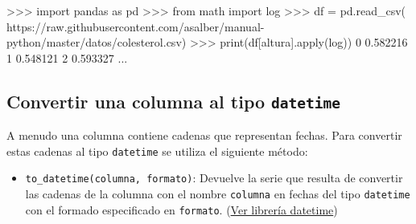 \documentclass[
  spanish,
  a4paper,
]{scrreport}
\newenvironment{Shaded}{\begin{snugshade}}{\end{snugshade}}
\newcommand{\BuiltInTok}[1]{\textcolor[rgb]{0.00,0.23,0.31}{#1}}
\newcommand{\DecValTok}[1]{\textcolor[rgb]{0.68,0.00,0.00}{#1}}
\newcommand{\FloatTok}[1]{\textcolor[rgb]{0.68,0.00,0.00}{#1}}
\newcommand{\ImportTok}[1]{\textcolor[rgb]{0.00,0.46,0.62}{#1}}
\newcommand{\NormalTok}[1]{\textcolor[rgb]{0.00,0.23,0.31}{#1}}
\newcommand{\OperatorTok}[1]{\textcolor[rgb]{0.37,0.37,0.37}{#1}}
\newcommand{\StringTok}[1]{\textcolor[rgb]{0.13,0.47,0.30}{#1}}
\providecommand{\tightlist}{%
  \setlength{\itemsep}{0pt}\setlength{\parskip}{0pt}}
\begin{document}
\begin{Shaded}
\begin{Highlighting}[]
\OperatorTok{\textgreater{}\textgreater{}\textgreater{}} \ImportTok{import}\NormalTok{ pandas }\ImportTok{as}\NormalTok{ pd}
\OperatorTok{\textgreater{}\textgreater{}\textgreater{}} \ImportTok{from}\NormalTok{ math }\ImportTok{import}\NormalTok{ log}
\OperatorTok{\textgreater{}\textgreater{}\textgreater{}}\NormalTok{ df }\OperatorTok{=}\NormalTok{ pd.read\_csv(}
\StringTok{\textquotesingle{}https://raw.githubusercontent.com/asalber/manual{-}python/master/datos/colesterol.csv\textquotesingle{}}\NormalTok{)}
\OperatorTok{\textgreater{}\textgreater{}\textgreater{}} \BuiltInTok{print}\NormalTok{(df[}\StringTok{\textquotesingle{}altura\textquotesingle{}}\NormalTok{].}\BuiltInTok{apply}\NormalTok{(log))}
\DecValTok{0}     \FloatTok{0.582216}
\DecValTok{1}     \FloatTok{0.548121}
\DecValTok{2}     \FloatTok{0.593327}
\NormalTok{...}
\end{Highlighting}
\end{Shaded}

\subsection{\texorpdfstring{Convertir una columna al tipo
\texttt{datetime}}{Convertir una columna al tipo datetime}}\label{convertir-una-columna-al-tipo-datetime}

A menudo una columna contiene cadenas que representan fechas. Para
convertir estas cadenas al tipo \texttt{datetime} se utiliza el
siguiente método:

\begin{itemize}
\tightlist
\item
  \texttt{to\_datetime(columna,\ formato)}: Devuelve la serie que
  resulta de convertir las cadenas de la columna con el nombre
  \texttt{columna} en fechas del tipo \texttt{datetime} con el formado
  especificado en \texttt{formato}. (\href{../datetime/}{Ver librería
  datetime})
\end{itemize}
\end{document}
